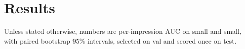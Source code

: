 \section{Results}
\label{sec:results}

Unless stated otherwise, numbers are per-impression AUC on \eb{} small and \mind{} small, with
paired bootstrap 95\% intervals, selected on val and scored once on test.






